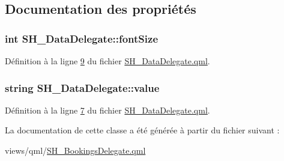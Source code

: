 \subsection{Documentation des propriétés}
\hypertarget{classSH__DataDelegate_afbb41ad9b513c7f27e7b5ad90d82e95b}{
\subsubsection[{font\-Size}]{\setlength{\rightskip}{0pt plus 5cm}int S\-H\-\_\-\-Data\-Delegate\-::font\-Size\hspace{0.3cm}{\ttfamily [inherited]}}}\label{classSH__DataDelegate_afbb41ad9b513c7f27e7b5ad90d82e95b}


Définition à la ligne \hyperlink{SH__DataDelegate_8qml_source_l00009}{9} du fichier \hyperlink{SH__DataDelegate_8qml_source}{S\-H\-\_\-\-Data\-Delegate.\-qml}.

\hypertarget{classSH__DataDelegate_acb9da3c73493c88865e08d9575f26482}{
\subsubsection[{value}]{\setlength{\rightskip}{0pt plus 5cm}string S\-H\-\_\-\-Data\-Delegate\-::value\hspace{0.3cm}{\ttfamily [inherited]}}}\label{classSH__DataDelegate_acb9da3c73493c88865e08d9575f26482}


Définition à la ligne \hyperlink{SH__DataDelegate_8qml_source_l00007}{7} du fichier \hyperlink{SH__DataDelegate_8qml_source}{S\-H\-\_\-\-Data\-Delegate.\-qml}.



La documentation de cette classe a été générée à partir du fichier suivant \-:\begin{DoxyCompactItemize}
\item 
views/qml/\hyperlink{SH__BookingsDelegate_8qml}{S\-H\-\_\-\-Bookings\-Delegate.\-qml}\end{DoxyCompactItemize}
